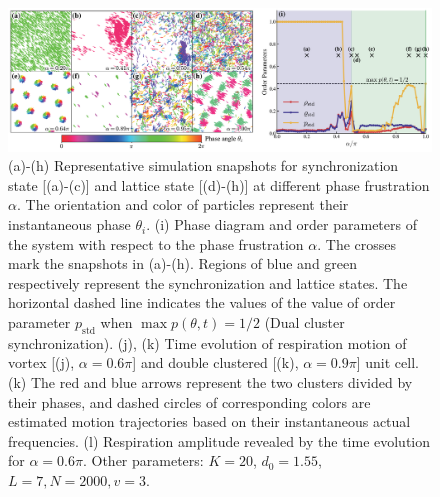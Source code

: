 \documentclass{article}
\begin{document}
\begin{figure}
    \centering
    \includegraphics[width=\textwidth]{./figs/snapshotsAndPhaseDiagram.pdf}
    \caption{
        \label{fig:snapshotsAndPhaseDiagram}
        (a)-(h) Representative simulation snapshots for synchronization state [(a)-(c)] and lattice state [(d)-(h)] at different phase frustration $\alpha$. The orientation and color of particles represent their instantaneous phase $\theta_i$.
        (i) Phase diagram and order parameters of the system with respect to the phase frustration $\alpha$. The crosses mark the snapshots in (a)-(h). Regions of blue and green respectively represent the synchronization and lattice states. The horizontal dashed line indicates the values of the value of order parameter $p_{\mathrm{std}}$ when $\max p(\theta, t)=1/2$ (Dual cluster synchronization). 
        (j), (k) Time evolution of respiration motion of vortex [(j), $\alpha=0.6\pi$] and double clustered [(k), $\alpha=0.9\pi$] unit cell. 
        (k) The red and blue arrows represent the two clusters divided by their phases, and dashed circles of corresponding colors are estimated motion trajectories based on their instantaneous actual frequencies.
        (l) Respiration amplitude revealed by the time evolution for $\alpha=0.6\pi$.
        Other parameters: $K=20$, $d_0=1.55$, $L=7, N=2000, v=3$. 
        }
\end{figure}
\end{document}
